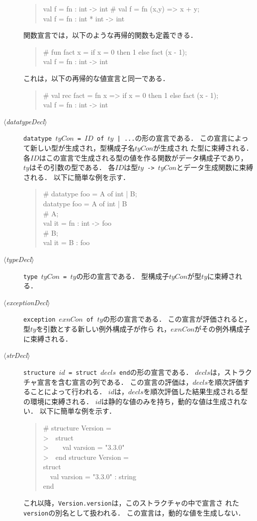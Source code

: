 \documentclass{jbook}
\newcommand{\version}{3.3.0}
\newcommand{\code}[1]{\mbox{\large\tt #1}}
\newcommand{\nonterm}[1]{\mbox{$\langle$}{\it #1}\mbox{$\rangle$}}
\newcommand{\myem}{\mbox{\ \ }}
\newenvironment{program}{\begin{quote}\begin{tt}}%
                        {\end{tt}\end{quote}}
\begin{document}
\begin{description}
\begin{program}
  val f = fn : int -> int
  \# val f = fn (x,y) => x + y;\\
  val f = fn : int * int -> int
\end{program}
	関数宣言では，以下のような再帰的関数も定義できる．
\begin{program}
  \# fun fact x = if x = 0 then 1 else fact (x - 1);\\
  val f = fn : int -> int
\end{program}
	これは，以下の再帰的な値宣言と同一である．
\begin{program}
  \# val rec fact = fn x => if x = 0 then 1 else fact (x - 1);\\
  val f = fn : int -> int
\end{program}
\item[\nonterm{datatypeDecl}] 
	\code{datatype $tyCon$ = $ID$ of $ty$ | ...}の形の宣言である．
	この宣言によって新しい型が生成され，型構成子名$tyCon$が生成され
た型に束縛される．
	各$ID$はこの宣言で生成される型の値を作る関数がデータ構成子であり，
$ty$はその引数の型である．
	各$ID$は型\code{$ty$ -> $tyCon$}とデータ生成関数に束縛される．
	以下に簡単な例を示す．
\begin{program}
  \# datatype foo = A of int | B;\\
  datatype foo = A of int | B\\
  \# A;\\
  val it = fn : int -> foo\\
  \# B;\\
  val it = B : foo
\end{program}

\item[\nonterm{typeDecl}] 
	\code{type $tyCon$ = $ty$}の形の宣言である．
	型構成子$tyCon$が型$ty$に束縛される．

\item[\nonterm{exceptionDecl}] 
	\code{exception $exnCon$ of $ty$}の形の宣言である．
	この宣言が評価されると，型$ty$を引数とする新しい例外構成子が作ら
れ，$exnCon$がその例外構成子に束縛される．

\item[\nonterm{strDecl}] 
	\code{structure $id$ = struct $decls$ end}の形の宣言である．
	$decls$は，ストラクチャ宣言を含む宣言の列である．
	この宣言の評価は，$decls$を順次評価することによって行われる．
	$id$は，$decls$を順次評価した結果生成される型の環境に束縛される．
	$id$は静的な値のみを持ち，動的な値は生成されない．
	以下に簡単な例を示す．
\begin{program}
  \# structure Version =\\
  >\myem struct\\
  >\myem\myem val varsion = "\version"\\
  >\myem end
  structure Version =\\
    struct\\
    \myem  val varsion = "\version" : string\\
    end
\end{program}
	これ以降，\code{Version.version}は，このストラクチャの中で宣言さ
れた\code{version}の別名として扱われる．
	この宣言は，動的な値を生成しない．
\end{description}
\else%
\end{document}
